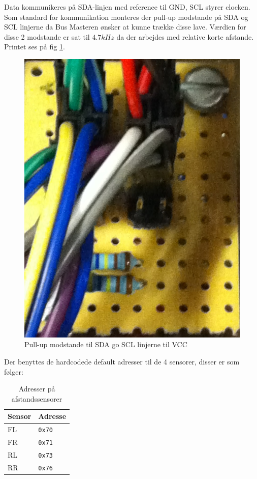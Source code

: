 Data kommunikeres på SDA-linjen med reference til GND, SCL styrer clocken. Som standard for \IIC kommunikation monteres der pull-up modstande på SDA og SCL linjerne da Bus Masteren ønsker at kunne trække disse lave.
Værdien for disse 2 modstande er sat til $4.7kHz$ da der arbejdes med relative korte afstande. Printet ses på fig \ref{fig:i2c_print}. 

\begin{figure}[ht]
	\centering
	\includegraphics[scale=0.2]{../fig/billeder/I2C_print.jpg}
	\caption{Pull-up modstande til SDA go SCL linjerne til VCC}
	\label{fig:i2c_print}
\end{figure}

\newpage
Der benyttes de hardcodede default adresser til de 4 sensorer, disser er som følger: 

\begin{table}[ht]\centering
	\begin{tabular}{| l | l |} \hline
		\textbf{Sensor} 	& \textbf{Adresse}  \\\hline
		FL 					& \texttt{0x70} 	\\\hline
		FR 					& \texttt{0x71} 	\\\hline
		RL 					& \texttt{0x73} 	\\\hline
		RR 					& \texttt{0x76} 	\\\hline
	\end{tabular}
	\caption{Adresser på afstandssensorer}
	\label{table:adr_ds}
\end{table}


